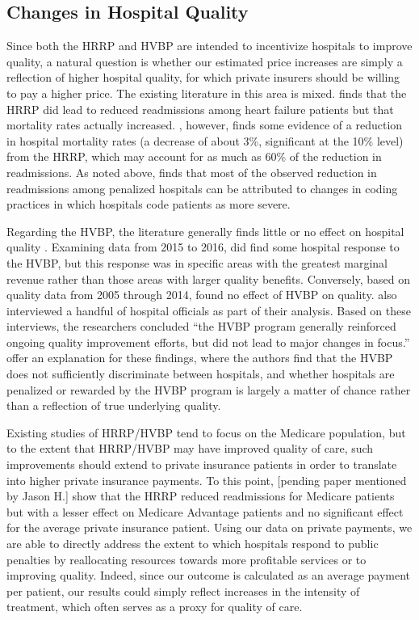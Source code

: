 \documentclass[12pt]{article}
\begin{document}
\subsection{Changes in Hospital Quality}
Since both the HRRP and HVBP are intended to incentivize hospitals to improve quality, a natural question is whether our estimated price increases are simply a reflection of higher hospital quality, for which private insurers should be willing to pay a higher price. The existing literature in this area is mixed. \cite{gupta2017} finds that the HRRP did lead to reduced readmissions among heart failure patients but that mortality rates actually increased. \cite{gupta2016}, however, finds some evidence of a reduction in hospital mortality rates (a decrease of about 3\%, significant at the 10\% level) from the HRRP, which may account for as much as 60\% of the reduction in readmissions.  As noted above, \citet{Ibrahim2017} finds that most of the observed reduction in readmissions among penalized hospitals can be attributed to changes in coding practices in which hospitals code patients as more severe.  

Regarding the HVBP, the literature generally finds little or no effect on hospital quality \citep{ryan2015,doran2017,norton2017,ryan2017}. Examining data from 2015 to 2016, \cite{norton2017} did find some hospital response to the HVBP, but this response was in specific areas with the greatest marginal revenue rather than those areas with larger quality benefits. Conversely, based on quality data from 2005 through 2014, \cite{gao2015} found no effect of HVBP on quality. \cite{gao2015} also interviewed a handful of hospital officials as part of their analysis. Based on these interviews, the researchers concluded ``the HVBP program generally reinforced ongoing quality improvement efforts, but did not lead to major changes in focus.'' \cite{friedson2016} offer an explanation for these findings, where the authors find that the HVBP does not sufficiently discriminate between hospitals, and whether hospitals are penalized or rewarded by the HVBP program is largely a matter of chance rather than a reflection of true underlying quality.

Existing studies of HRRP/HVBP tend to focus on the Medicare population, but to the extent that HRRP/HVBP may have improved quality of care, such improvements should extend to private insurance patients in order to translate into higher private insurance payments. To this point, [pending paper mentioned by Jason H.] show that the HRRP reduced readmissions for Medicare patients but with a lesser effect on Medicare Advantage patients and no significant effect for the average private insurance patient.  Using our data on private payments, we are able to directly address the extent to which hospitals respond to public penalties by reallocating resources towards more profitable services or to improving quality.  Indeed, since our outcome is calculated as an average payment per patient, our results could simply reflect increases in the intensity of treatment, which often serves as a proxy for quality of care.    
\end{document}

